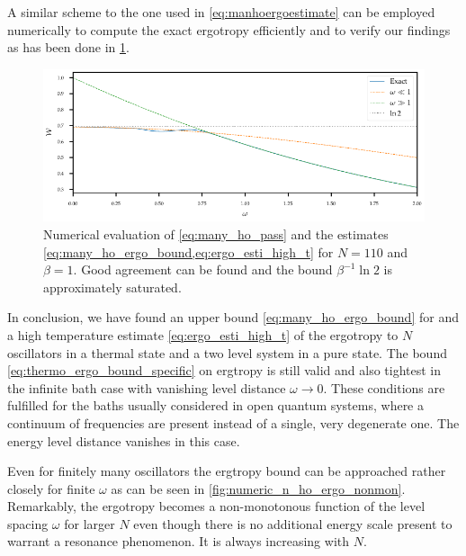 A similar scheme to the one used in \cref{eq:manhoergoestimate} can be
employed numerically to compute the exact ergotropy efficiently and to verify our
findings as has been done in \cref{fig:numeric_n_ho_ergo}.
\begin{figure}[htp]
  \includegraphics{figs/ergo_calc/ergo_numeric}
  \caption{\label{fig:numeric_n_ho_ergo} Numerical evaluation of
    \cref{eq:many_ho_pass} and the estimates
    \cref{eq:many_ho_ergo_bound,eq:ergo_esti_high_t} for \(N=110\)
    and \(β=1\). Good agreement can be found and the bound
    \(β^{-1}\ln2\) is approximately saturated.}
\end{figure}

In conclusion, we have found an upper bound
\cref{eq:many_ho_ergo_bound} for and a high temperature estimate
\cref{eq:ergo_esti_high_t} of the ergotropy to \(N\) oscillators in a
thermal state and a two level system in a pure state. The bound
\cref{eq:thermo_ergo_bound_specific} on ergtropy is still valid and
also tightest in the infinite bath case with vanishing level distance
\(ω\to 0\). These conditions are fulfilled for the baths usually
considered in open quantum systems, where a continuum of frequencies
are present instead of a single, very degenerate one. The energy level
distance vanishes in this case.

Even for finitely many oscillators the ergtropy bound can be
approached rather closely for finite \(ω\) as can be seen in
\cref{fig:numeric_n_ho_ergo_nonmon}. Remarkably, the ergotropy becomes
a non-monotonous function of the level spacing \(ω\) for larger \(N\)
even though there is no additional energy scale present to warrant a
resonance phenomenon.  It is always increasing with \(N\).

